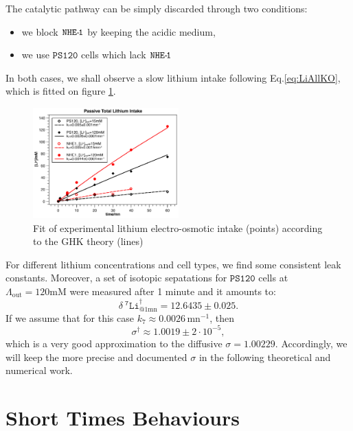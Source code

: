 \documentclass[aps,onecolumn,11pt]{revtex4}
\newcommand{\mychem}[1]{\mathtt{#1}}
\newcommand{\spLi}[1]{{~^{\mychem{#1}}\mychem{Li}}}
\newcommand{\deltaLi}{ {\delta\!\!\!\spLi{7}} }
\newcommand{\LiAll}{\Lambda}
\newcommand{\LiAllOut}{{\LiAll}_{\mathrm{out}}}
\newcommand{\NHE}[1]{\mychem{NHE}{\mychem{\hbox{-}\!#1}}}
\newcommand{\todo}[1]{\framebox{\textbf{\color{WildStrawberry}{#1}}}}
\newcommand{\ko}{\dagger}
\begin{document}
The catalytic pathway can be simply discarded through two conditions:
\begin{itemize}
	\item we block $\NHE{1}$ by keeping the acidic medium,
	\item we use   $\mychem{PS120}$ cells which lack $\NHE{1}$
\end{itemize}
In both cases, we shall observe a slow lithium intake following Eq.\eqref{eq:LiAllKO}, which is fitted on figure \ref{fig:leak}.
\begin{figure}[!ht]
\begin{center}
\includegraphics[width=0.5\textwidth]{leaks.pdf}
\end{center}
\caption{\label{fig:leak} Fit of experimental lithium electro-osmotic intake (points) according to the GHK theory (lines)}
\end{figure}
For different lithium concentrations and cell types, we find some consistent leak constants.
Moreover, a set of isotopic sepatations for $\mychem{PS120}$ cells at $\LiAllOut=120\text{mM}$ were measured after 1 minute and it amounts to:
\begin{equation}
\label{eq:d7ps120}
\deltaLi^\ko_{@1\text{mn}} = 12.6435 \pm 0.025.
\end{equation}
If we assume that
for this case $k_7\approx0.0026\,\text{mn}^{-1}$, then
\begin{equation}
	\sigma^\ko \approx 1.0019 \pm 2\cdot10^{-5},
\end{equation}
which is a very good approximation \todo{given the crude assumptions} to the diffusive $\sigma=1.00229$. Accordingly, we will keep the more precise and documented $\sigma$ 
in the following theoretical and numerical work.

\section{Short Times Behaviours}
\end{document}

